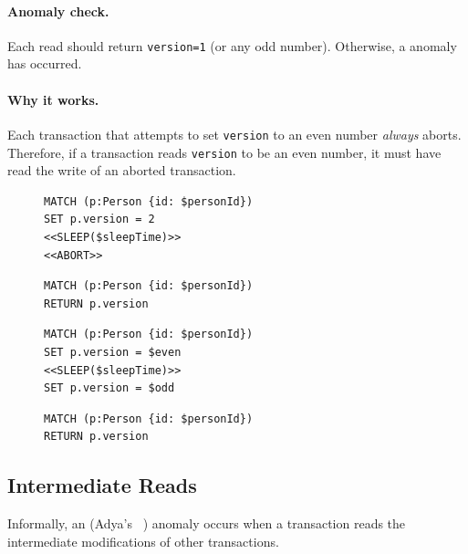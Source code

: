 \paragraph{Anomaly check.}
Each read should return \texttt{version=1} (or any odd number).
Otherwise, a  anomaly has occurred.

\paragraph{Why it works.}
Each transaction that attempts to set \texttt{version} to an even number \emph{always} aborts.
Therefore, if a transaction reads \texttt{version} to be an even number, it must have read the write of an aborted transaction.

\begin{figure}[htb]
\centering
\begin{minipage}{0.45\linewidth}
\begin{lstlisting}[language=cypher,label=fig:ar1,caption=\tx{Aborted Read (G1a) $T_\mathrm{W}$}.]
MATCH (p:Person {id: $personId})
SET p.version = 2
<<SLEEP($sleepTime)>>
<<ABORT>>
\end{lstlisting}

\begin{lstlisting}[language=cypher,label=fig:ar2,caption=\tx{Aborted Read (G1a) $T_\mathrm{R}$}.]
MATCH (p:Person {id: $personId})
RETURN p.version
\end{lstlisting}
\end{minipage}
%
\quad
%
\begin{minipage}{0.45\linewidth}
\begin{lstlisting}[language=cypher,label=fig:ir1,caption=\tx{Interm. Read (G1b) $T_\mathrm{W}$}.]
MATCH (p:Person {id: $personId})
SET p.version = $even
<<SLEEP($sleepTime)>>
SET p.version = $odd
\end{lstlisting}

\begin{lstlisting}[language=cypher,label=fig:ir2,caption=\tx{Interm. Read (G1b) $T_\mathrm{R}$}.]
MATCH (p:Person {id: $personId})
RETURN p.version
\end{lstlisting}
\end{minipage}
\end{figure}

\subsection*{Intermediate Reads}

Informally, an  (Adya's ~\cite{adya1999weak}) anomaly occurs when a transaction reads the intermediate modifications of other transactions.


